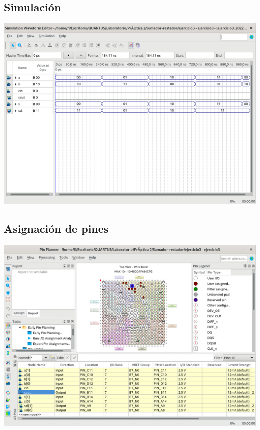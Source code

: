 \documentclass[10pt,a4paper]{article}
\begin{document}
	\subsection{Simulación}
	\begin{center}
		\includegraphics[scale=0.35]{Simulacion.png}
	\end{center}

	\subsection{Asignación de pines}
	\begin{center}
		\includegraphics[scale=0.35]{Pines.png}
	\end{center}
\end{document}
